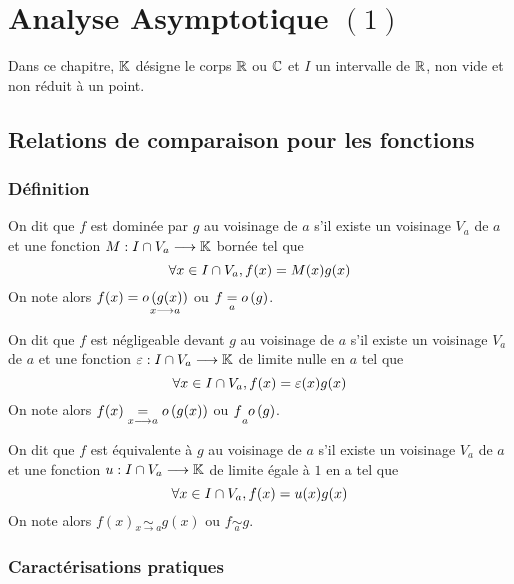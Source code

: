 \chapter{Analyse Asymptotique \((1)\)}

\minitoc
Dans ce chapitre, \(\mathbb{K}\) désigne le corps \(\mathbb{R}\) ou \(\mathbb{C}\) et \(I\) un intervalle de \(\mathbb{R}\), non vide et non réduit à un point.

\section{Relations de comparaison pour les fonctions}

\subsection{Définition}
\begin{defprop}[Domination]
    On dit que \(f\) est dominée par \(g\) au voisinage de \(a\) s’il existe un voisinage \(V_a\) de \(a\) et une fonction \(M : I \cap V_a \longrightarrow \mathbb{K}\) bornée tel que
    \[\forall x \in  I \cap V_a, f (x) = M (x)g(x)\]
    On note alors \(f (x) = \underset{x\longrightarrow a }{o \left(g(x)\right)}\) ou \(f \underset{a}{=} o \left(g\right)\).
\end{defprop}


\begin{defprop}[Négligeabilité]
    On dit que \(f\) est négligeable devant \(g\) au voisinage de \(a\) s’il existe un voisinage \(V_a\) de \(a\) et une fonction \(\varepsilon : I \cap V_a \longrightarrow \mathbb{K}\) de limite nulle en \(a\) tel que
    \[\forall x \in  I \cap V_a, f (x) = \varepsilon(x)g(x)\]
    On note alors \(f (x) \underset{x\longrightarrow a}{=}o \left(g(x)\right)\) ou \(f \underset{a}{} o \left(g\right)\).
\end{defprop}
\begin{defprop}[Equivalence]
    On dit que \(f\) est équivalente à \(g\) au voisinage de \(a\) s’il existe un voisinage \(V_a\) de \(a\) et une fonction \(u : I \cap V_a \longrightarrow \mathbb{K}\) de limite égale à \(1\) en a tel que
    \[\forall x \in  I \cap V_a, f (x) = u(x)g(x)\]
    On note alors \(f (x) \underset{x\to a}{\sim} g(x)\) ou \(f \underset{a}{\sim} g\).
\end{defprop}

\subsection{Caractérisations pratiques}

